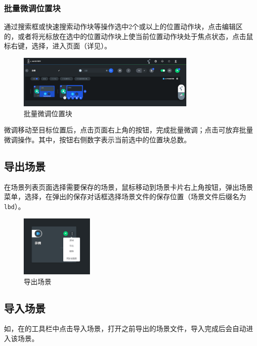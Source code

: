 \subsubsection{批量微调位置块}
通过搜索框或快速搜索动作块等操作选中2个或以上的位置动作块，点击编辑区的，或者将光标放在选中的位置动作块上使当前位置动作块处于焦点状态，点击鼠标右键，选择，进入页面（详见）。

\begin{figure}[hb]
	\centering
	\includegraphics[height=2.6cm]{screen/3-18.png}
	\caption{批量微调位置块}
	\label{fig:批量微调位置块}
\end{figure}

微调移动至目标位置后，点击页面右上角的按钮，完成批量微调；点击可放弃批量微调操作。其中，按钮右侧数字表示当前选中的位置块总数。


\subsection{导出场景}
在场景列表页面选择需要保存的场景，鼠标移动到场景卡片右上角按钮，弹出场景菜单，选择，在弹出的保存对话框选择场景文件的保存位置（场景文件后缀名为 \verb|lbd|）。

\begin{figure}[htb!]
	\centering
	\includegraphics[height=3cm]{screen/3-19.png}
	\caption{导出场景}
	\label{fig:导出场景}
\end{figure}

\subsection{导入场景}
如，在的工具栏中点击导入场景，打开之前导出的场景文件，导入完成后会自动进入该场景。

